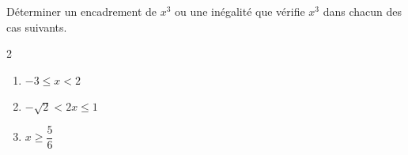 \begin{exo}{}
	Déterminer un encadrement de $x^3$ ou une inégalité que vérifie $x^3$ dans chacun des cas suivants.
	\vspace*{-2mm}
	\begin{multicols}{2}
	\begin{enumerate}[itemsep=2mm]
		\item $-3 \le x < 2$
		\item $-\sqrt{2} < 2x \le 1$
		\item $x \ge \dfrac{5}{6}$
	\end{enumerate}
	\end{multicols}\vspace*{-2mm}
\end{exo}
